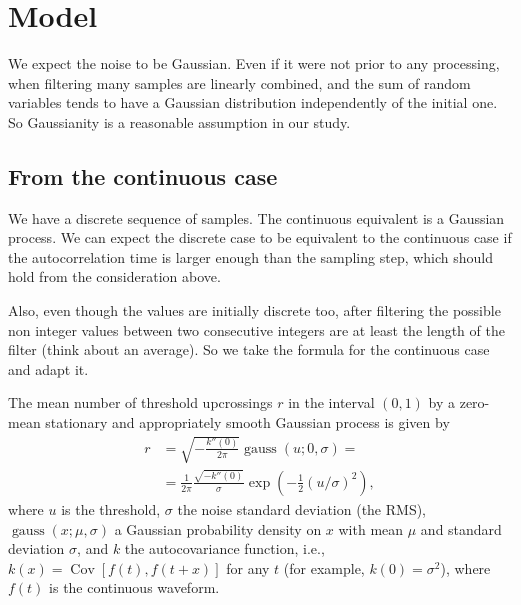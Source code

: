 \section{Model}

We expect the noise to be Gaussian. Even if it were not prior to any
processing, when filtering many samples are linearly combined, and the sum of
random variables tends to have a Gaussian distribution independently of the
initial one. So Gaussianity is a reasonable assumption in our study.

\subsection{From the continuous case}

We have a discrete sequence of samples. The continuous equivalent is a Gaussian
process. We can expect the discrete case to be equivalent to the continuous
case if the autocorrelation time is larger enough than the sampling step, which
should hold from the consideration above.

Also, even though the values are initially discrete too, after filtering the
possible non integer values between two consecutive integers are at least the
length of the filter (think about an average). So we take the formula for the
continuous case and adapt it.

The mean number of threshold upcrossings $r$ in the interval $(0,1)$ by a
zero-mean stationary and appropriately smooth Gaussian process is given by
\cite[81]{rasmussen2006}
%
\begin{align}
    r &= \sqrt{-\frac{k''(0)}{2\pi}} \operatorname{gauss}(u;0,\sigma) = \\
      &= \frac 1 {2\pi} \frac {\sqrt{-k''(0)}} \sigma
         \exp \left( -\frac12 (u/\sigma)^2 \right),
\end{align}
%
where $u$ is the threshold, $\sigma$ the noise standard deviation (the RMS),
$\operatorname{gauss}(x;\mu,\sigma)$ a Gaussian probability density on $x$ with
mean $\mu$ and standard deviation $\sigma$, and $k$ the autocovariance
function, i.e., $k(x) = \operatorname{Cov}[f(t), f(t+x)]$ for any $t$ (for
example, $k(0) = \sigma^2$), where $f(t)$ is the continuous waveform.

